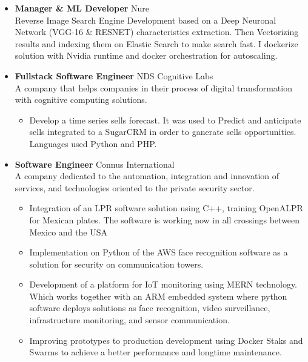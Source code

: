 \documentclass[]{friggeri-cv}
\renewenvironment{entrylist}{%
  \begin{itemize}[leftmargin=0.9in]%
}{%
  \end{itemize}
}
\renewcommand{\entry}[4]{%
  \item[#1] 
    \textbf{#2}%
    \hfill%
    {\footnotesize\addfontfeature{Color=pblue} #3 }\\%
    #4\vspace{\parsep}%
  }
\begin{document}
\begin{entrylist}
{\begin{itemize}[label=$•$]
	\end{itemize}
    }  
  \entry
    {06/18 - Present}
    {Manager \& ML Developer}
    {Nure\vspace{1mm}}
    { Reverse Image Search Engine Development based on a Deep Neuronal Network (VGG-16 \& RESNET) characteristics extraction. Then Vectorizing results and indexing them on Elastic Search to make search fast. I dockerize solution with Nvidia runtime and docker orchestration for autoscaling.\vspace{-2mm}\\}
  \entry
    {09/18 - 02/19}
    {Fullstack Software Engineer}
    {NDS Cognitive Labs}
    {A company that helps companies in their process of digital transformation with cognitive computing solutions.\\\vspace{-3mm}
    \begin{itemize}[label=$•$]
    \addtolength{\itemindent}{-4mm}
    	\item Develop a time series sells forecast. It was used to Predict and anticipate sells integrated to a SugarCRM in order to ganerate sells opportunities. Languages used Python and PHP.\vspace{1mm}
	\end{itemize}
    }
  \entry
    {03/17 - 09/18}
    {Software Engineer}
    {Connus International}
    {A company dedicated to the automation, integration and innovation of services, and technologies oriented to the private security sector.\\\vspace{-3mm}
    \begin{itemize}[label=$•$]
    \addtolength{\itemindent}{-4mm}
    	\item Integration of an LPR software solution using C++, training OpenALPR for Mexican plates. The software is working now in all crossings between Mexico and the USA\vspace{1mm}
    	\item Implementation on Python of the AWS face recognition software as a solution for security on communication towers.\vspace{1mm}
    	\item Development of a platform for IoT monitoring using MERN technology. Which works together with an ARM embedded system where python software deploys solutions as face recognition, video surveillance, infrastructure monitoring, and sensor communication.\vspace{1mm}
		\item Improving prototypes to production development using Docker Staks and Swarms to achieve a better performance and longtime maintenance.\vspace{1mm}

\end{itemize}}
\end{entrylist}
\end{document}
